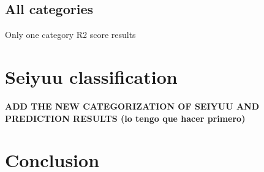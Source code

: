 \FloatBarrier
\subsection{All categories}
\begin{table}[!hbt]
	\begin{center}
	\caption{Only one category R2 score results}
	\label{tab:allCategories}
	
	\end{center}
\end{table}

\section{Seiyuu classification}
\textbf{ADD THE NEW CATEGORIZATION OF SEIYUU AND PREDICTION RESULTS (lo tengo que hacer primero)}

\section{Conclusion}
